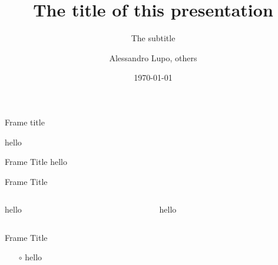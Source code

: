 \documentclass[aspectratio=169,hyperref={pdfpagelabels=false}]{beamer}
\date{\today}
\title{The title of this presentation}
\subtitle{The subtitle}
\author{Alessandro Lupo, others}
\institute{Aix-Marseille Université}
\begin{document}
\maketitle

\begin{frame}{Frame title}

    hello
    
\end{frame}

\begin{frame}{Frame Title}
    \centering
    hello
    
\end{frame}

\begin{frame}{Frame Title}
    \begin{columns}
        \begin{column}{0.5\textwidth}
        hello
        \end{column}

        \begin{column}{0.5\textwidth}
        hello
        \end{column}
    \end{columns}
    
\end{frame}

\begin{frame}{Frame Title}
    \begin{itemize}
        \item[$\circ$] hello
    \end{itemize}
    
\end{frame}
\end{document}
